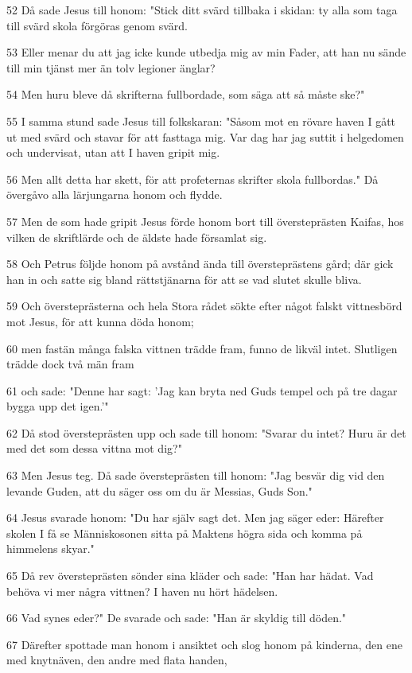 \par 52 Då sade Jesus till honom: "Stick ditt svärd tillbaka i skidan: ty alla som taga till svärd skola förgöras genom svärd.
\par 53 Eller menar du att jag icke kunde utbedja mig av min Fader, att han nu sände till min tjänst mer än tolv legioner änglar?
\par 54 Men huru bleve då skrifterna fullbordade, som säga att så måste ske?"
\par 55 I samma stund sade Jesus till folkskaran: "Såsom mot en rövare haven I gått ut med svärd och stavar för att fasttaga mig. Var dag har jag suttit i helgedomen och undervisat, utan att I haven gripit mig.
\par 56 Men allt detta har skett, för att profeternas skrifter skola fullbordas." Då övergåvo alla lärjungarna honom och flydde.
\par 57 Men de som hade gripit Jesus förde honom bort till översteprästen Kaifas, hos vilken de skriftlärde och de äldste hade församlat sig.
\par 58 Och Petrus följde honom på avstånd ända till översteprästens gård; där gick han in och satte sig bland rättstjänarna för att se vad slutet skulle bliva.
\par 59 Och översteprästerna och hela Stora rådet sökte efter något falskt vittnesbörd mot Jesus, för att kunna döda honom;
\par 60 men fastän många falska vittnen trädde fram, funno de likväl intet. Slutligen trädde dock två män fram
\par 61 och sade: "Denne har sagt: 'Jag kan bryta ned Guds tempel och på tre dagar bygga upp det igen.'"
\par 62 Då stod översteprästen upp och sade till honom: "Svarar du intet? Huru är det med det som dessa vittna mot dig?"
\par 63 Men Jesus teg. Då sade översteprästen till honom: "Jag besvär dig vid den levande Guden, att du säger oss om du är Messias, Guds Son."
\par 64 Jesus svarade honom: "Du har själv sagt det. Men jag säger eder: Härefter skolen I få se Människosonen sitta på Maktens högra sida och komma på himmelens skyar."
\par 65 Då rev översteprästen sönder sina kläder och sade: "Han har hädat. Vad behöva vi mer några vittnen? I haven nu hört hädelsen.
\par 66 Vad synes eder?" De svarade och sade: "Han är skyldig till döden."
\par 67 Därefter spottade man honom i ansiktet och slog honom på kinderna, den ene med knytnäven, den andre med flata handen,
